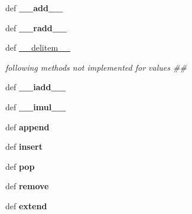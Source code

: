 \begin{CompactItemize}
\item 
\hypertarget{classPyPedal_1_1odict_1_1__values_0a9c615f7f058276bb117631cd323ea4}{
def \textbf{\_\-\_\-add\_\-\_\-}}
\label{classPyPedal_1_1odict_1_1__values_0a9c615f7f058276bb117631cd323ea4}

\item 
\hypertarget{classPyPedal_1_1odict_1_1__values_422702fc51c29d0a8e07b055b0c584ea}{
def \textbf{\_\-\_\-radd\_\-\_\-}}
\label{classPyPedal_1_1odict_1_1__values_422702fc51c29d0a8e07b055b0c584ea}

\item 
\hypertarget{classPyPedal_1_1odict_1_1__values_ca18baf65aeda2882756b772750ca0a5}{
def \hyperlink{classPyPedal_1_1odict_1_1__values_ca18baf65aeda2882756b772750ca0a5}{\_\-\_\-delitem\_\-\_\-}}
\label{classPyPedal_1_1odict_1_1__values_ca18baf65aeda2882756b772750ca0a5}

\begin{CompactList}\small\item\em following methods not implemented for values \#\# \item\end{CompactList}\item 
\hypertarget{classPyPedal_1_1odict_1_1__values_7ebf22425edfd9b256aeff09705c83b2}{
def \textbf{\_\-\_\-iadd\_\-\_\-}}
\label{classPyPedal_1_1odict_1_1__values_7ebf22425edfd9b256aeff09705c83b2}

\item 
\hypertarget{classPyPedal_1_1odict_1_1__values_540a380e113746671533ade99f544713}{
def \textbf{\_\-\_\-imul\_\-\_\-}}
\label{classPyPedal_1_1odict_1_1__values_540a380e113746671533ade99f544713}

\item 
\hypertarget{classPyPedal_1_1odict_1_1__values_67efe509222281e2cb32d466d3d1c07a}{
def \textbf{append}}
\label{classPyPedal_1_1odict_1_1__values_67efe509222281e2cb32d466d3d1c07a}

\item 
\hypertarget{classPyPedal_1_1odict_1_1__values_0e558e64ebddd88c05f5e55ed5eb7df2}{
def \textbf{insert}}
\label{classPyPedal_1_1odict_1_1__values_0e558e64ebddd88c05f5e55ed5eb7df2}

\item 
\hypertarget{classPyPedal_1_1odict_1_1__values_9352442f4e400aac83d18816c7db6ba7}{
def \textbf{pop}}
\label{classPyPedal_1_1odict_1_1__values_9352442f4e400aac83d18816c7db6ba7}

\item 
\hypertarget{classPyPedal_1_1odict_1_1__values_64f6d575564a63c08a4e6d2c4eedca62}{
def \textbf{remove}}
\label{classPyPedal_1_1odict_1_1__values_64f6d575564a63c08a4e6d2c4eedca62}

\item 
\hypertarget{classPyPedal_1_1odict_1_1__values_d53fdf95b666c82470589ca506188204}{
def \textbf{extend}}
\label{classPyPedal_1_1odict_1_1__values_d53fdf95b666c82470589ca506188204}

\end{CompactItemize}


